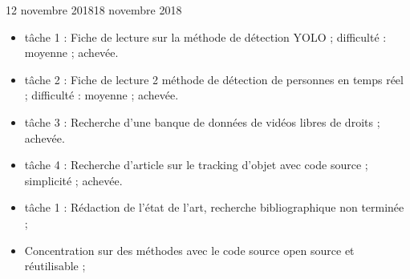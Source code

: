 \documentclass[12pt]{fiche-rd-info}
\begin{document}

\begin{fichesuivi}{12 novembre 2018}{18 novembre 2018}

	\begin{travaileffectue}
		\begin{itemize}
			\item tâche 1 : Fiche de lecture sur la méthode de détection YOLO ; difficulté : moyenne ; achevée.
			\item tâche 2 : Fiche de lecture 2 méthode de détection de personnes en temps réel  ; difficulté : moyenne ; achevée.
			\item tâche 3 : Recherche d'une banque de données de vidéos libres de droits ; achevée.
			\item tâche 4 : Recherche d'article sur le tracking d'objet avec code source ; simplicité ; achevée.
		\end{itemize}
	\end{travaileffectue}

	\begin{travailnoneffectue}
		\begin{itemize}
				\item tâche 1 : Rédaction de l'état de l'art, recherche bibliographique non terminée ;
		\end{itemize}
	\end{travailnoneffectue}

	\begin{echange}
		\begin{itemize}
			\item Concentration sur des méthodes avec le code source open source et réutilisable ;
		\end{itemize}
	\end{echange}


\end{fichesuivi}
\end{document}
